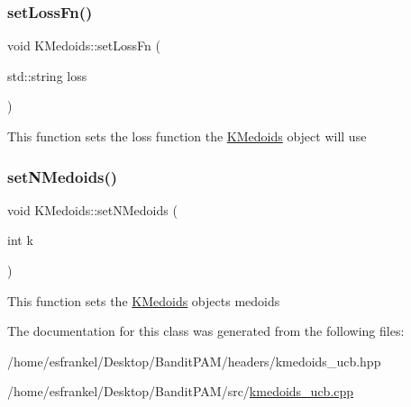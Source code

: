 \subsubsection{\texorpdfstring{set\+Loss\+Fn()}{setLossFn()}}
{\footnotesize\ttfamily void K\+Medoids\+::set\+Loss\+Fn (\begin{DoxyParamCaption}\item[{std\+::string}]{loss }\end{DoxyParamCaption})}

This function sets the loss function the \hyperlink{classKMedoids}{K\+Medoids} object will use \mbox{\label{classKMedoids_a65760033bcae8de418d350c6fc4981da}} 
\subsubsection{\texorpdfstring{set\+N\+Medoids()}{setNMedoids()}}
{\footnotesize\ttfamily void K\+Medoids\+::set\+N\+Medoids (\begin{DoxyParamCaption}\item[{int}]{k }\end{DoxyParamCaption})}

This function sets the \hyperlink{classKMedoids}{K\+Medoids} object\textquotesingle{}s medoids 

The documentation for this class was generated from the following files\+:\begin{DoxyCompactItemize}
\item 
/home/esfrankel/\+Desktop/\+Bandit\+P\+A\+M/headers/kmedoids\+\_\+ucb.\+hpp\item 
/home/esfrankel/\+Desktop/\+Bandit\+P\+A\+M/src/\hyperlink{kmedoids__ucb_8cpp}{kmedoids\+\_\+ucb.\+cpp}\end{DoxyCompactItemize}
